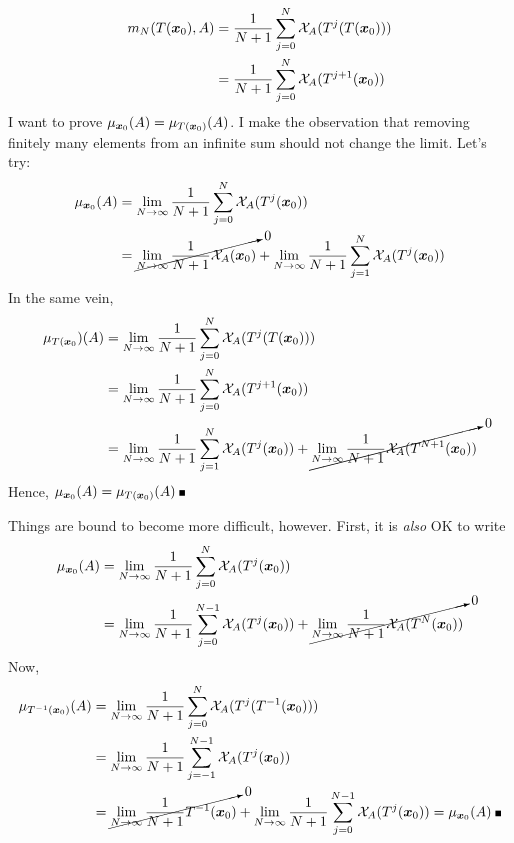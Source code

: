 \documentclass[12pt]{article}
\begin{document}
\begin{align*}
m_N(T(\boldsymbol{x}_0),A) &= \frac{1}{N+1}\sum_{j=0}^N \mathord{\mathcal{X}}_A(T^j(T(\boldsymbol{x}_0)))\\
                    &= \frac{1}{N+1}\sum_{j=0}^N \mathord{\mathcal{X}}_A(T^{j+1}(\boldsymbol{x}_0))
\end{align*}
I want to prove $\mu_{\boldsymbol{x}_0}(A) = \mu_{T(\boldsymbol{x}_0)}(A)$. I make the
observation that removing finitely many elements from an infinite sum should not
change the limit. Let's try:
\begin{align*}
\mu_{\boldsymbol{x}_0}(A) &= \lim_{N\to\infty} \frac{1}{N+1}\sum_{j=0}^N \mathord{\mathcal{X}}_A(T^j(\boldsymbol{x}_0))\\
                   &= \cancelto{0}{\lim_{N\to\infty} \frac{1}{N+1} \mathord{\mathcal{X}}_A(\boldsymbol{x}_0)} + 
                      \lim_{N\to\infty} \frac{1}{N+1} \sum_{j=1}^N \mathord{\mathcal{X}}_A(T^j(\boldsymbol{x}_0))
\end{align*}
In the same vein,
\begin{align*}
\mu_{T(\boldsymbol{x}_0})(A) &= \lim_{N\to\infty} \frac{1}{N+1}\sum_{j=0}^N \mathord{\mathcal{X}}_A(T^j(T(\boldsymbol{x}_0)))\\
                      &= \lim_{N\to\infty} \frac{1}{N+1} \sum_{j=0}^N \mathord{\mathcal{X}}_A(T^{j+1}(\boldsymbol{x}_0))\\
                      &= \lim_{N\to\infty} \frac{1}{N+1} \sum_{j=1}^N \mathord{\mathcal{X}}_A(T^{j}(\boldsymbol{x}_0))
                      +   \cancelto{0}{\lim_{N\to\infty} \frac{1}{N+1} \mathord{\mathcal{X}}_A(T^{N+1}(\boldsymbol{x}_0))}
\end{align*}
Hence, $\mu_{\vet{x}_0}(A) = \mu_{T(\vet{x}_0)}(A)\blob$

Things are bound to become more difficult, however. First, it is \emph{also} OK to write
\begin{align*}
\mu_{\boldsymbol{x}_0}(A) &= \lim_{N\to\infty} \frac{1}{N+1}\sum_{j=0}^N \mathord{\mathcal{X}}_A(T^j(\boldsymbol{x}_0))\\
                   &= \lim_{N\to\infty} \frac{1}{N+1} \sum_{j=0}^{N-1} \mathord{\mathcal{X}}_A(T^j(\boldsymbol{x}_0))
                   +  \cancelto{0}{\lim_{N\to\infty} \frac{1}{N+1} \mathord{\mathcal{X}}_A(T^N(\boldsymbol{x}_0))}
\end{align*}
Now,
\begin{align*}
\mu_{T^{-1}(\vet{x}_0)}(A) &= \lim_{N\to\infty} \frac{1}{N+1}\sum_{j=0}^N \Chi_A(T^j(T^{-1}(\vet{x}_0)))\\
                   &= \lim_{N\to\infty} \frac{1}{N+1} \sum_{j=-1}^{N-1} \Chi_A(T^{j}(\vet{x}_0))\\
                   &= \cancelto{0}{\lim_{N\to\infty} \frac{1}{N+1} T^{-1}(\vet{x}_0)} +
                      \lim_{N\to\infty} \frac{1}{N+1} \sum_{j=0}^{N-1} \Chi_A(T^{j}(\vet{x}_0)) = \mu_{\vet{x}_0}(A)\blob
\end{align*}
\end{document}
